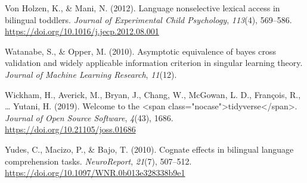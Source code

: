 \documentclass[
  english,
  man,man,floatsintext]{apa6}
\newlength{\cslhangindent}
\newenvironment{cslreferences}%
  {\setlength{\parindent}{0pt}%
  \everypar{\setlength{\hangindent}{\cslhangindent}}\ignorespaces}%
  {\par}
\begin{document}
\begin{cslreferences}
\leavevmode\hypertarget{ref-von_holzen_language_2012}{}%
Von Holzen, K., \& Mani, N. (2012). Language nonselective lexical access in bilingual toddlers. \emph{Journal of Experimental Child Psychology}, \emph{113}(4), 569--586. \url{https://doi.org/10.1016/j.jecp.2012.08.001}

\leavevmode\hypertarget{ref-watanabe_asymptotic_2010}{}%
Watanabe, S., \& Opper, M. (2010). Asymptotic equivalence of bayes cross validation and widely applicable information criterion in singular learning theory. \emph{Journal of Machine Learning Research}, \emph{11}(12).

\leavevmode\hypertarget{ref-wickham_welcome_2019}{}%
Wickham, H., Averick, M., Bryan, J., Chang, W., McGowan, L. D., François, R., \ldots{} Yutani, H. (2019). Welcome to the \textless span class="nocase"\textgreater tidyverse\textless/span\textgreater. \emph{Journal of Open Source Software}, \emph{4}(43), 1686. \url{https://doi.org/10.21105/joss.01686}

\leavevmode\hypertarget{ref-yudes_cognate_2010}{}%
Yudes, C., Macizo, P., \& Bajo, T. (2010). Cognate effects in bilingual language comprehension tasks. \emph{NeuroReport}, \emph{21}(7), 507--512. \url{https://doi.org/10.1097/WNR.0b013e328338b9e1}
\end{cslreferences}

\endgroup
\end{document}

